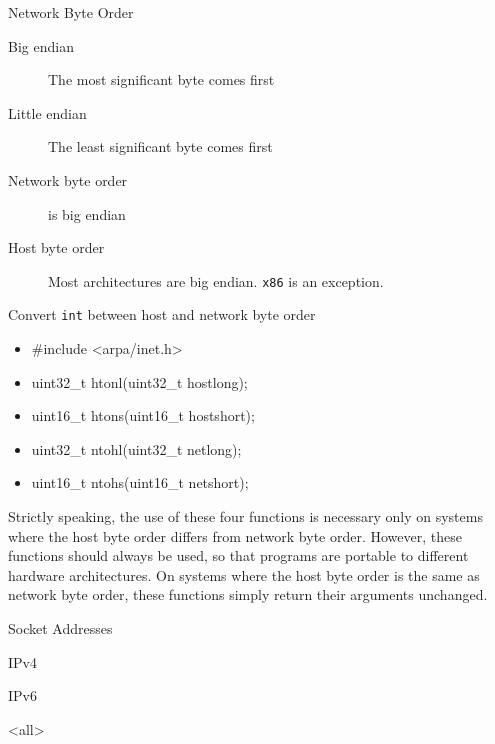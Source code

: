 \begin{frame}{Network Byte Order}
  \begin{description}
  \item[Big endian] The most significant byte comes first
  \item[Little endian] The least significant byte comes first
  \end{description}
  \begin{center}
  \end{center}
  \begin{description}
  \item[Network byte order] is big endian
  \item[Host byte order] Most architectures are big endian. \texttt{x86} is an exception.
  \end{description}
\end{frame}

\begin{frame}
  \begin{iblock}{Convert \texttt{int} between host and network byte order}
    \ttfamily
    \begin{itemize}
      \item[] \#include <arpa/inet.h>
      \item[] uint32\_t htonl(uint32\_t hostlong);
      \item[] uint16\_t htons(uint16\_t hostshort);
      \item[] uint32\_t ntohl(uint32\_t netlong);
      \item[] uint16\_t ntohs(uint16\_t netshort);
    \end{itemize}
  \end{iblock}
\end{frame}

Strictly speaking, the use of these four functions is necessary only on systems where the
host byte order differs from network byte order. However, these functions should always
be used, so that programs are portable to different hardware architectures. On systems
where the host byte order is the same as network byte order, these functions simply return
their arguments unchanged. 

\begin{frame}{Socket Addresses}
  \begin{iblock}{IPv4}
    \centering
  \end{iblock}
  \begin{iblock}{IPv6}
    \centering
  \end{iblock}
\end{frame}


\mode<all>
